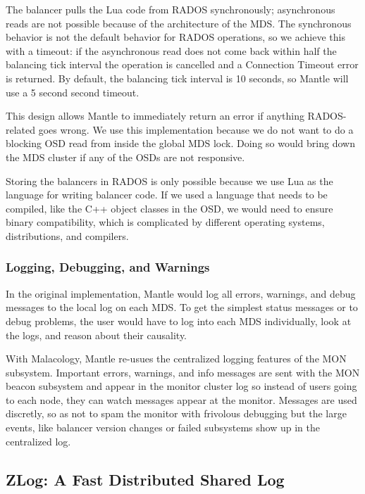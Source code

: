 \documentclass[preprint]{sigplanconf-eurosys}
\begin{document}
The balancer pulls the Lua code from RADOS synchronously; asynchronous reads
are not possible because of the architecture of the MDS. The synchronous
behavior is not the default behavior for RADOS operations, so we achieve this
with a timeout: if the asynchronous read does not come back within half the
balancing tick interval the operation is cancelled and a Connection Timeout
error is returned. By default, the balancing tick interval is 10 seconds, so
Mantle will use a 5 second second timeout.

This design allows Mantle to immediately return an error if anything
RADOS-related goes wrong.  We use this implementation because we do not want to
do a blocking OSD read from inside the global MDS lock. Doing so would bring
down the MDS cluster if any of the OSDs are not responsive.

Storing the balancers in RADOS is only possible because we use Lua as the
language for writing balancer code. If we used a language that needs to be
compiled, like the C++ object classes in the OSD, we would need to ensure
binary compatibility, which is complicated by different operating systems,
distributions, and compilers.

\subsubsection{Logging, Debugging, and Warnings}

In the original implementation, Mantle would log all errors, warnings, and
debug messages to the local log on each MDS. To get the simplest status
messages or to debug problems, the user would have to log into each MDS
individually, look at the logs, and reason about their causality. 

With Malacology, Mantle re-usues the centralized logging features of the MON
subsystem. Important errors, warnings, and info messages are sent with the MON
beacon subsystem and appear in the monitor cluster log so instead of users
going to each node, they can watch messages appear at the monitor. Messages are
used discretly, so as not to spam the monitor with frivolous debugging but the
large events, like balancer version changes or failed subsystems show up in the
centralized log.

\subsection{ZLog: A Fast Distributed Shared Log}
\label{sec:zlog}
\end{document}
